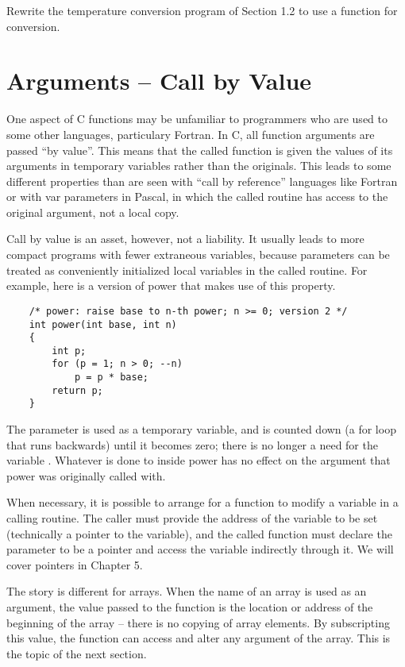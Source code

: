 \begin{ExerciseList}
\Exercise Rewrite the temperature conversion program of Section 1.2 to use a function for conversion.
\end{ExerciseList}

\section{Arguments -- Call by Value}

One aspect of C functions may be unfamiliar to programmers who are used to some other languages, particulary Fortran.
In C, all function arguments are passed ``by value''. This means that the called function is given the values of its arguments in temporary variables rather than the originals.
This leads to some different properties than are seen with ``call by reference'' languages like Fortran or with var parameters in Pascal, in which the called routine has access to the original argument, not a local copy.

Call by value is an asset, however, not a liability.
It usually leads to more compact programs with fewer extraneous variables, because parameters can be treated as conveniently initialized local variables in the called routine.
For example, here is a version of power that makes use of this property.
\begin{lstlisting}
	/* power: raise base to n-th power; n >= 0; version 2 */
	int power(int base, int n)
	{
		int p;
		for (p = 1; n > 0; --n)
			p = p * base;
		return p;
	}
\end{lstlisting}
The parameter  is used as a temporary variable, and is counted down (a for loop that runs backwards) until it becomes zero; there is no longer a need for the variable .
Whatever is done to  inside power has no effect on the argument that power was originally called with.

When necessary, it is possible to arrange for a function to modify a variable in a calling routine.
The caller must provide the address of the variable to be set (technically a pointer to the variable), and the called function must declare the parameter to be a pointer and access the variable indirectly through it.
We will cover pointers in Chapter 5.

The story is different for arrays.
When the name of an array is used as an argument, the value passed to the function is the location or address of the beginning of the array -- there is no copying of array elements.
By subscripting this value, the function can access and alter any argument of the array.
This is the topic of the next section.



